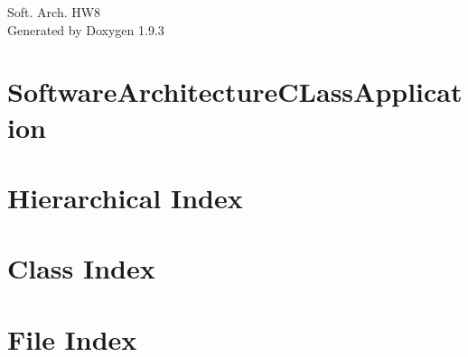 \documentclass[twoside]{book}
\newcommand{\+}{\discretionary{\mbox{\scriptsize$\hookleftarrow$}}{}{}}
\newcommand{\clearemptydoublepage}{%
    \newpage{\pagestyle{empty}\cleardoublepage}%
  }
\begin{document}
  \raggedbottom
    \hypersetup{pageanchor=false,
                bookmarksnumbered=true,
                pdfencoding=unicode
               }
  \begin{titlepage}
  \vspace*{7cm}
  \begin{center}%
  {\Large Soft. Arch. HW8}\\
  \vspace*{1cm}
  {\large Generated by Doxygen 1.9.3}\\
  \end{center}
  \end{titlepage}
  \clearemptydoublepage
  \tableofcontents
  \clearemptydoublepage
  \hypersetup{pageanchor=true}
\chapter{Software\+Architecture\+CLass\+Application}
\label{md__c___users__robert__schuster__source__repos__software_architecture_c_lass_application1__r_e_a_d_m_e}

\chapter{Hierarchical Index}

\chapter{Class Index}

\chapter{File Index}

\end{document}
